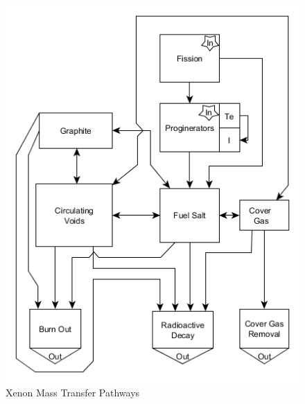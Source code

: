 \begin{figure}[ht]
\includegraphics[width=\textwidth,height=\textheight,keepaspectratio]{XeBlocks.png} 
\caption{Xenon Mass Transfer Pathways}
\label{XeBlocks}
\end{figure}